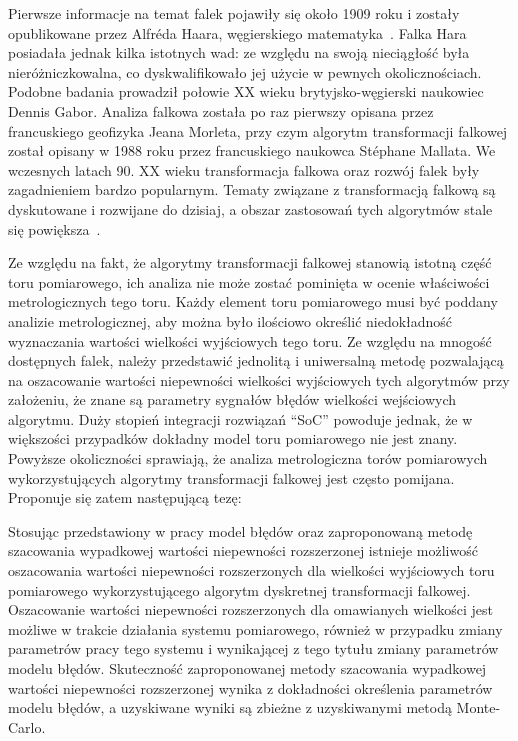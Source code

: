 Pierwsze informacje na temat falek pojawiły się około 1909 roku i zostały opublikowane przez Alfréda Haara, węgierskiego matematyka~\cite{haar_basics}. Falka Hara posiadała jednak kilka istotnych wad: ze względu na swoją nieciągłość była nieróżniczkowalna, co dyskwalifikowało jej użycie w pewnych okolicznościach. Podobne badania prowadził połowie XX wieku brytyjsko-węgierski naukowiec Dennis Gabor. Analiza falkowa została po raz pierwszy opisana przez francuskiego geofizyka Jeana Morleta, przy czym algorytm transformacji falkowej został opisany w 1988 roku przez francuskiego naukowca Stéphane Mallata. We wczesnych latach 90. XX wieku transformacja falkowa oraz rozwój falek były zagadnieniem bardzo popularnym. Tematy związane z transformacją falkową są dyskutowane i rozwijane do dzisiaj, a obszar zastosowań tych algorytmów stale się powiększa~\cite{akujuobi_applications}.

Ze względu na fakt, że algorytmy transformacji falkowej stanowią istotną część toru pomiarowego, ich analiza nie może zostać pominięta w ocenie właściwości metrologicznych tego toru. Każdy element toru pomiarowego musi być poddany analizie metrologicznej, aby można było ilościowo określić niedokładność wyznaczania wartości wielkości wyjściowych tego toru. Ze względu na mnogość dostępnych falek, należy przedstawić jednolitą i uniwersalną metodę pozwalającą na oszacowanie wartości niepewności wielkości wyjściowych tych algorytmów przy założeniu, że znane są parametry sygnałów błędów wielkości wejściowych algorytmu. Duży stopień integracji rozwiązań \enquote{SoC} powoduje jednak, że w większości przypadków dokładny model toru pomiarowego nie jest znany. Powyższe okoliczności sprawiają, że analiza metrologiczna torów pomiarowych wykorzystujących algorytmy transformacji falkowej jest często pomijana. Proponuje się zatem następującą tezę:

\begin{quoting}[font = bfseries]
Stosując przedstawiony w pracy model błędów oraz zaproponowaną metodę szacowania wypadkowej wartości niepewności rozszerzonej istnieje możliwość oszacowania wartości niepewności rozszerzonych dla wielkości wyjściowych toru pomiarowego wykorzystującego algorytm dyskretnej transformacji falkowej. Oszacowanie wartości niepewności rozszerzonych dla omawianych wielkości jest możliwe w trakcie działania systemu pomiarowego, również w przypadku zmiany parametrów pracy tego systemu i wynikającej z tego tytułu zmiany parametrów modelu błędów. Skuteczność zaproponowanej metody szacowania wypadkowej wartości niepewności rozszerzonej wynika z dokładności określenia parametrów modelu błędów, a uzyskiwane wyniki są zbieżne z uzyskiwanymi metodą Monte-Carlo.
\end{quoting}

